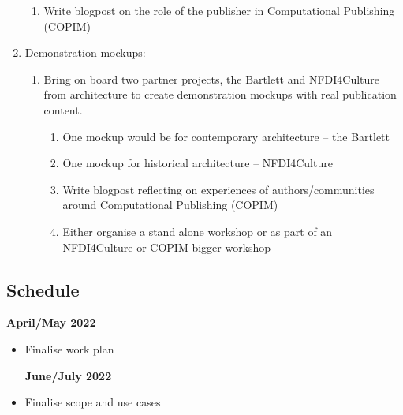 \documentclass{article}
\begin{document}
\begin{enumerate}[start=2]
\begin{enumerate}
\item Write blogpost on the role of the publisher in Computational Publishing (COPIM)


\end{enumerate}

\item Demonstration mockups:

\begin{enumerate}
\item Bring on board two partner projects, the Bartlett and NFDI4Culture from architecture to create demonstration mockups with real publication content.

\begin{enumerate}
\item One mockup would be for contemporary architecture – the Bartlett


\item One mockup for historical architecture – NFDI4Culture


\item Write blogpost reflecting on experiences of authors/communities around Computational Publishing (COPIM)


\item Either organise a stand alone workshop or as part of an NFDI4Culture or COPIM bigger workshop


\end{enumerate}

\end{enumerate}

\end{enumerate}

\subsection{Schedule}\label{H8614052}



\textbf{April/May 2022}

\begin{itemize}
\item Finalise work plan



\textbf{June/July 2022}


\end{itemize}
\begin{itemize}
\item Finalise scope and use cases


\end{itemize}
\end{document}
